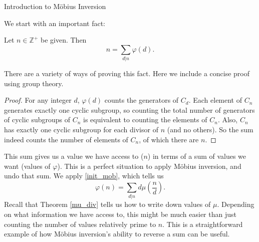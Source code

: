 \documentclass[12pt]{pom_thesis}
\newcommand{\Zz}{\mathbb{Z}}
\begin{document}
\begin{chapter}{Introduction to M\"obius Inversion}
\begin{examp}
We start with an important fact:
\begin{thm}[Gauss]\label{gauss}
Let $n \in \Zz^+$ be given. Then 
\[
n = \sum_{d|n}\varphi(d).
\]
\end{thm}
There are a variety of ways of proving this fact. Here we include a concise proof using group theory.
\begin{proof}
For any integer $d$, $\varphi(d)$ counts the generators of $C_d$. Each element of $C_n$ generates exactly one cyclic subgroup, so counting the total number of generators of cyclic subgroups of $C_n$ is equivalent to counting the elements of $C_n$. Also, $C_n$ has exactly one cyclic subgroup for each divisor of $n$ (and no others). So the sum indeed counts the number of elements of $C_n$, of which there are $n$.
\end{proof}
This sum gives us a value we have access to ($n$) in terms of a sum of values we want (values of $\varphi$). This is a perfect situation to apply M\"obius inversion, and undo that sum. We apply \eqref{init_mob}, which tells us
\[
\varphi(n) = \sum_{d|n} d\mu\left(\frac nd\right).
\]
Recall that Theorem \ref{mu_div} tells us how to write down values of $\mu$. Depending on what information we have access to, this might be much easier than just counting the number of values relatively prime to $n$. This is a straightforward example of how M\"obius inversion's ability to reverse a sum can be useful.
\end{examp}
\end{chapter}
\end{document}
